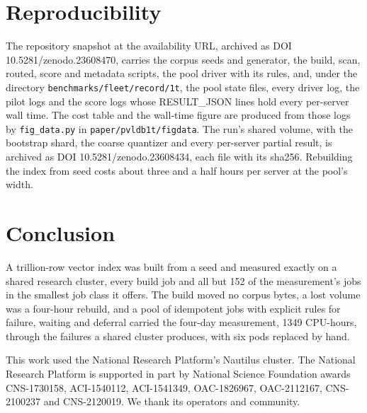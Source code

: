\documentclass[sigconf, nonacm]{acmart}
\begin{document}
\section{Reproducibility}

The repository snapshot at the availability URL, archived as DOI 10.5281/zenodo.23608470,
carries the corpus seeds and generator, the build, scan,
routed, score and metadata scripts, the pool driver with its rules, and, under the directory
\texttt{benchmarks/fleet/record/1t}, the pool state files, every driver log, the pilot logs and the
score logs whose RESULT\_JSON lines hold every per-server wall time. The cost table and the
wall-time figure are produced from those logs by \texttt{fig\_data.py} in
\texttt{paper/pvldb1t/figdata}. The run's shared volume, with the bootstrap shard, the coarse quantizer and
every per-server partial result, is archived as DOI 10.5281/zenodo.23608434, each file with its
sha256. Rebuilding the index from seed costs about three and a half hours per server at the pool's width.

\section{Conclusion}

A trillion-row vector index was built from a seed and measured exactly on a shared research
cluster, every build job and all but 152 of the measurement's jobs in the smallest job class it
offers. The build moved no corpus bytes, a lost volume was a
four-hour rebuild, and a pool of idempotent jobs with explicit rules for failure, waiting and
deferral carried the four-day measurement, 1349 CPU-hours, through the failures a shared cluster
produces, with six pods replaced by hand.

\begin{acks}
This work used the National Research Platform's Nautilus cluster. The National Research Platform
is supported in part by National Science Foundation awards CNS-1730158, ACI-1540112, ACI-1541349,
OAC-1826967, OAC-2112167, CNS-2100237 and CNS-2120019. We thank its operators and community.
\end{acks}



\end{document}
